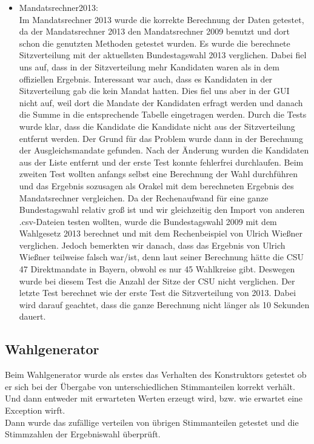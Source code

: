 \documentclass[12pt,a4paper,titlepage]{article}
\begin{document}
\begin{itemize}
\item Mandatsrechner2013:\\
Im Mandatsrechner 2013 wurde die korrekte Berechnung der Daten getestet, da der Mandatsrechner 2013 den Mandatsrechner 2009 benutzt und dort schon die genutzten Methoden getestet wurden. Es wurde die berechnete Sitzverteilung mit der aktuellsten Bundestagswahl 2013 verglichen. Dabei fiel uns auf, dass in der Sitzverteilung mehr Kandidaten waren als in dem offiziellen Ergebnis. Interessant war auch, dass es Kandidaten in der Sitzverteilung gab die kein Mandat hatten. Dies fiel uns aber in der GUI nicht auf, weil dort die Mandate der Kandidaten erfragt werden und danach die Summe in die entsprechende Tabelle eingetragen werden. Durch die Tests wurde klar, dass die Kandidate die Kandidate nicht aus der Sitzverteilung entfernt werden. Der Grund für das Problem wurde dann in der Berechnung der Ausgleichsmandate gefunden. Nach der Änderung wurden die Kandidaten aus der Liste entfernt und der erste Test konnte fehlerfrei durchlaufen.
Beim zweiten Test wollten anfangs selbst eine Berechnung der Wahl durchführen und das Ergebnis sozusagen als Orakel mit dem berechneten Ergebnis des Mandatsrechner vergleichen. Da der Rechenaufwand für eine ganze Bundestagswahl relativ groß ist und wir gleichzeitig den Import von anderen .csv-Dateien testen wollten, wurde die Bundestagswahl 2009 mit dem Wahlgesetz 2013 berechnet und mit dem Rechenbeispiel von Ulrich Wießner verglichen. Jedoch bemerkten wir danach, dass das Ergebnis von Ulrich Wießner teilweise falsch war/ist, denn laut seiner Berechnung hätte die CSU 47 Direktmandate in Bayern, obwohl es nur 45 Wahlkreise gibt. Deswegen wurde bei diesem Test die Anzahl der Sitze der CSU nicht verglichen.
Der letzte Test berechnet wie der erste Test die Sitzverteilung von 2013. Dabei wird darauf geachtet, dass die ganze Berechnung nicht länger als 10 Sekunden dauert. 

\end{itemize}

\subsection{Wahlgenerator}
Beim Wahlgenerator wurde als erstes das Verhalten des Konstruktors getestet ob er sich bei der Übergabe von unterschiedlichen Stimmanteilen korrekt verhält. Und dann entweder mit erwarteten Werten erzeugt wird, bzw. wie erwartet eine Exception wirft.\\

Dann wurde das zufällige verteilen von übrigen Stimmanteilen getestet und die Stimmzahlen der Ergebniswahl überprüft.\\
\end{document}
